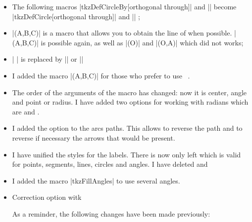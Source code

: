 \begin{itemize}
If you want to draw a circle, you can't do so |\tkzDrawCircle[R](A,1)|. First you have to define the point through which the circle passes, so you have to do 
|\tkzDefCircle[R](A,1)| || and finally |\tkzDrawCircle(A,a)|. Another possibilty is to define a point on the circle |\tkzDefShiftPoint[A](1,O){a}|;


\item The following macros  |tkzDefCircleBy[orthogonal through]| and || become |tkzDefCircle[orthogonal through]| and || ;


\item |\tkzDefLine[euler](A,B,C)| is a macro that allows you to obtain the line of  when possible. |\tkzDefLine[altitude](A,B,C)| is possible again, as well as |\tkzDefLine[tangent at=A](O)| and |\tkzDefLine[tangent from=P](O,A)| which did not works;


\item | \tkzDefTangent| is replaced by |\tkzDelLine[tangent from = ...]| or |\tkzDelLine[tangent at = ...]|


\item I added the macro |(A,B,C)| for those who prefer to use  \TIKZ\ .

\item 
The order of the arguments of the macro  has changed: now it is center, angle and point or radius.
I have added two options for working with radians which are  and .


\item I added the option  to the arcs paths. This allows to reverse the path and to reverse if necessary the arrows that would be present.


\item I have unified the styles for the labels. There is now only  left which is valid for points, segments, lines, circles and angles. I have deleted   and 

\item I added the macro |tkzFillAngles| to use several angles.

\item Correction option  witk 

As a reminder, the following changes have been made previously:
  

\end{itemize}

